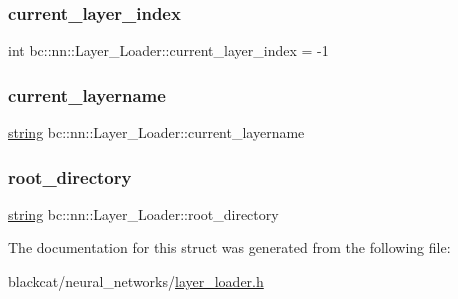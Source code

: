\subsubsection{\texorpdfstring{current\+\_\+layer\+\_\+index}{current\_layer\_index}}
{\footnotesize\ttfamily int bc\+::nn\+::\+Layer\+\_\+\+Loader\+::current\+\_\+layer\+\_\+index = -\/1}

\mbox{\label{structbc_1_1nn_1_1Layer__Loader_a51ea68daf7551573c3bd85d805c25da6}} 
\subsubsection{\texorpdfstring{current\+\_\+layername}{current\_layername}}
{\footnotesize\ttfamily \hyperlink{structbc_1_1string}{string} bc\+::nn\+::\+Layer\+\_\+\+Loader\+::current\+\_\+layername}

\mbox{\label{structbc_1_1nn_1_1Layer__Loader_a8447f957112de14989e567aab56d847b}} 
\subsubsection{\texorpdfstring{root\+\_\+directory}{root\_directory}}
{\footnotesize\ttfamily \hyperlink{structbc_1_1string}{string} bc\+::nn\+::\+Layer\+\_\+\+Loader\+::root\+\_\+directory}



The documentation for this struct was generated from the following file\+:\begin{DoxyCompactItemize}
\item 
blackcat/neural\+\_\+networks/\hyperlink{layer__loader_8h}{layer\+\_\+loader.\+h}\end{DoxyCompactItemize}

